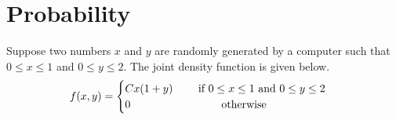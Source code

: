 \documentclass[11pt,letterpaper]{article}
\newif\ifshowsolutions
\newcommand{\sol}[1]{%
  \ifshowsolutions
  {\color{red}#1}%
  \fi
}
\begin{document}
\sol{%
\textbf{Solution.}
Area in polar coordinates: $A=\displaystyle\iint_D dA=\int_\alpha^\beta\int_0^{r(\theta)} r\,dr\,d\theta$.

\textbf{Step 1 (one loop).}
For $r=\cos(2\theta)\ge 0$, one loop uses $-\dfrac{\pi}{4}\le\theta\le\dfrac{\pi}{4}$ and $0\le r\le\cos(2\theta)$.

\textbf{Step 2 (integrate).}
\[
A=\int_{-\pi/4}^{\pi/4}\int_0^{\cos(2\theta)} r\,dr\,d\theta
=\int_{-\pi/4}^{\pi/4}\frac{1}{2}\cos^2(2\theta)\,d\theta.
\]
Use $\cos^2(2\theta)=\dfrac{1+\cos(4\theta)}{2}$:
\[
A=\frac{1}{4}\int_{-\pi/4}^{\pi/4}\bigl(1+\cos(4\theta)\bigr)\,d\theta
=\frac{1}{4}\left[\theta+\frac{\sin(4\theta)}{4}\right]_{-\pi/4}^{\pi/4}
=\frac{1}{4}\cdot\frac{\pi}{2}
=\boxed{\frac{\pi}{8}}.
\]
}

\vfill 

\pagebreak 


 \section{Probability}
Suppose two numbers $x$ and $y$ are randomly generated by a computer such that ${0\leq x\leq 1}$ and $0\leq y\leq 2$. The joint density function is given below.
$$ f(x,y) = \begin{cases}
Cx(1+y)\qquad \text{ if $ 0\leq x\leq 1$ and $ 0\leq y\leq 2$}\\
0 \qquad\qquad\qquad\qquad \text{ otherwise} \end{cases} $$
 
\end{document}
